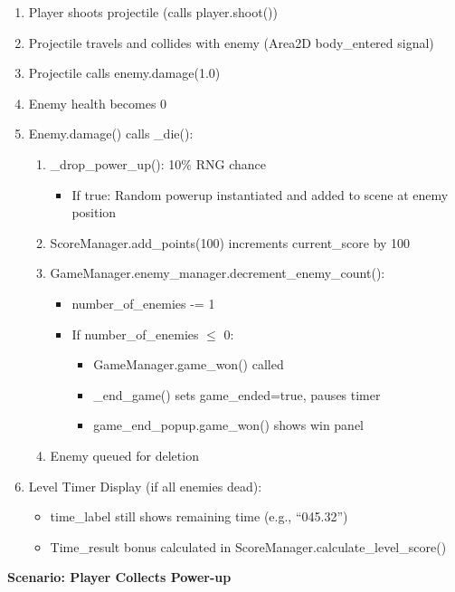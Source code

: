 \documentclass{article}
\begin{document}
\begin{enumerate}
    \item Player shoots projectile (calls player.shoot())
    \item Projectile travels and collides with enemy (Area2D body\_entered signal)
    \item Projectile calls enemy.damage(1.0)
    \item Enemy health becomes 0
    \item Enemy.damage() calls \_die():
    \begin{enumerate}
        \item \_drop\_power\_up(): 10\% RNG chance
        \begin{itemize}
            \item If true: Random powerup instantiated and added to scene at enemy position
        \end{itemize}
        \item ScoreManager.add\_points(100) increments current\_score by 100
        \item GameManager.enemy\_manager.decrement\_enemy\_count():
        \begin{itemize}
            \item number\_of\_enemies -= 1
            \item If number\_of\_enemies $\leq$ 0:
            \begin{itemize}
                \item GameManager.game\_won() called
                \item \_end\_game() sets game\_ended=true, pauses timer
                \item game\_end\_popup.game\_won() shows win panel
            \end{itemize}
        \end{itemize}
        \item Enemy queued for deletion
    \end{enumerate}
    \item Level Timer Display (if all enemies dead):
    \begin{itemize}
        \item time\_label still shows remaining time (e.g., ``045.32'')
        \item Time\_result bonus calculated in ScoreManager.calculate\_level\_score()
    \end{itemize}
\end{enumerate}

\textbf{Scenario: Player Collects Power-up}
\end{document}
